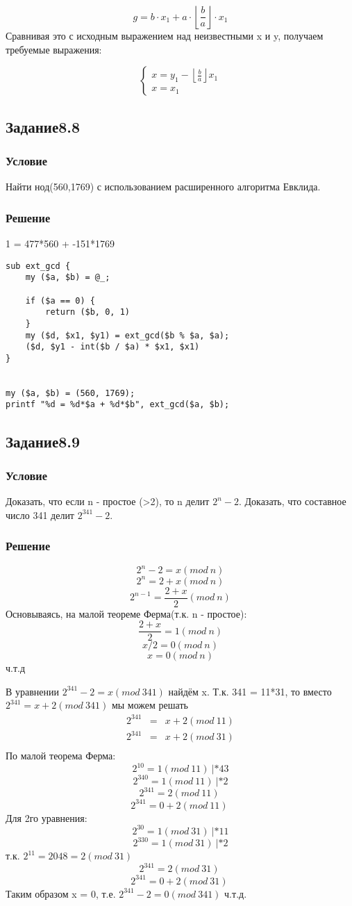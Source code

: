 \documentclass[10pt,a4paper]{article}
\begin{document}
$$ g = b \cdot x_1 + a \cdot \left\lfloor \frac{b}{a} \right\rfloor
\cdot x_1   $$
Сравнивая это с исходным выражением над неизвестными x и y, получаем требуемые выражения:

\[
\begin{cases}
x = y_1 - \left\lfloor \frac{b}{a} \right\rfloor x_1 \\
x = x_1
\end{cases}
\]

\subsection*{Задание8.8}
\subsubsection*{Условие}
Найти нод(560,1769) с использованием расширенного алгоритма
Евклида.
\subsubsection*{Решение}
1 = 477*560 + -151*1769
\begin{lstlisting}
sub ext_gcd {
    my ($a, $b) = @_;

    if ($a == 0) {
        return ($b, 0, 1)
    }
    my ($d, $x1, $y1) = ext_gcd($b % $a, $a);
    ($d, $y1 - int($b / $a) * $x1, $x1)
}


my ($a, $b) = (560, 1769);
printf "%d = %d*$a + %d*$b", ext_gcd($a, $b);
\end{lstlisting}

\subsection*{Задание8.9}
\subsubsection*{Условие}
Доказать, что если n - простое (>2), то n делит $2^n-2$. Доказать, что
составное число 341 делит $2^{341}-2$.
\subsubsection*{Решение}
$$ 2^n - 2 = x (mod\ n) $$
$$ 2^n = 2 + x (mod\ n) $$
$$ 2^{n-1} = \frac{2 + x}{2} (mod\ n) $$
Основываясь, на малой теореме Ферма(т.к. n - простое):
$$ \frac{2 + x}{2} = 1 (mod\ n) $$
$$ x/2 = 0 (mod\ n) $$
$$ x = 0 (mod\ n) $$
ч.т.д

В уравнении $ 2^{341} - 2 = x (mod\ 341) $ найдём x. Т.к. 341 = 11*31,
то вместо $ 2^{341} = x + 2 (mod\ 341) $ мы можем решать
\begin{eqnarray*}
2^{341} & = & x + 2 (mod\ 11)  \\
2^{341} & = & x + 2 (mod\ 31)  \\
\end{eqnarray*}
По малой теорема Ферма:
$$ 2^{10} = 1 (mod\ 11)\ | * 43 $$
$$ 2^{340} = 1 (mod\ 11)\ | * 2$$
$$ 2^{341} = 2 (mod\ 11)\ $$
$$ 2^{341} = 0 + 2 (mod\ 11)\ $$
Для 2го уравнения:
$$ 2^{30} = 1 (mod\ 31)\ | * 11 $$
$$ 2^{330} = 1 (mod\ 31)\ | * 2$$
т.к. $ 2^{11} = 2048 = 2 (mod\ 31) $
$$ 2^{341} = 2 (mod\ 31)\ $$
$$ 2^{341} = 0 + 2 (mod\ 31)\ $$
Таким образом x = 0, т.е.
$ 2^{341} - 2 = 0 (mod\ 341) $
ч.т.д.
\end{document}

